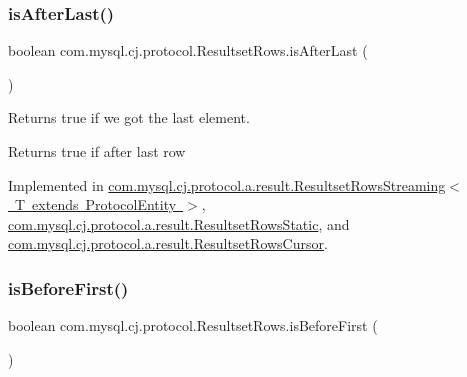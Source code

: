 \mbox{\label{interfacecom_1_1mysql_1_1cj_1_1protocol_1_1_resultset_rows_a8599e016249b697a11560806dc290a87}} 
\subsubsection{\texorpdfstring{is\+After\+Last()}{isAfterLast()}}
{\footnotesize\ttfamily boolean com.\+mysql.\+cj.\+protocol.\+Resultset\+Rows.\+is\+After\+Last (\begin{DoxyParamCaption}{ }\end{DoxyParamCaption})}

Returns true if we got the last element.

\begin{DoxyReturn}{Returns}
true if after last row 
\end{DoxyReturn}


Implemented in \mbox{\hyperlink{classcom_1_1mysql_1_1cj_1_1protocol_1_1a_1_1result_1_1_resultset_rows_streaming_a87d9941d48a1d379d2387082904ebe6c}{com.\+mysql.\+cj.\+protocol.\+a.\+result.\+Resultset\+Rows\+Streaming$<$ T extends Protocol\+Entity $>$}}, \mbox{\hyperlink{classcom_1_1mysql_1_1cj_1_1protocol_1_1a_1_1result_1_1_resultset_rows_static_a7b010d9bacc8bb948e66a76d4ef4e0d4}{com.\+mysql.\+cj.\+protocol.\+a.\+result.\+Resultset\+Rows\+Static}}, and \mbox{\hyperlink{classcom_1_1mysql_1_1cj_1_1protocol_1_1a_1_1result_1_1_resultset_rows_cursor_a26d45087615e0f6baa7a8b52d33a0ec4}{com.\+mysql.\+cj.\+protocol.\+a.\+result.\+Resultset\+Rows\+Cursor}}.

\mbox{\label{interfacecom_1_1mysql_1_1cj_1_1protocol_1_1_resultset_rows_a748205e182d8b1b1263ebe78c7062517}} 
\subsubsection{\texorpdfstring{is\+Before\+First()}{isBeforeFirst()}}
{\footnotesize\ttfamily boolean com.\+mysql.\+cj.\+protocol.\+Resultset\+Rows.\+is\+Before\+First (\begin{DoxyParamCaption}{ }\end{DoxyParamCaption})}

